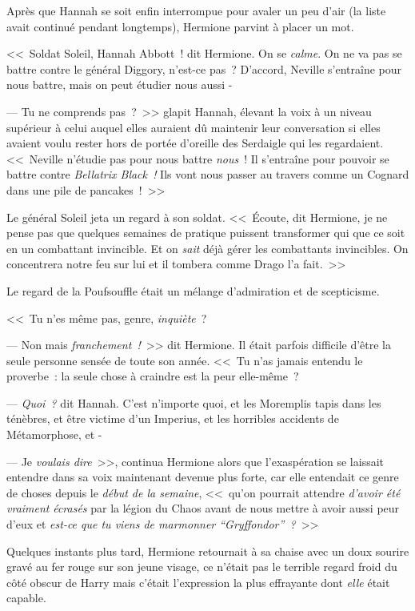 Après que Hannah se soit enfin interrompue pour avaler un peu d'air (la liste avait continué pendant longtemps), Hermione parvint à placer un mot.

<<~Soldat Soleil, Hannah Abbott~! dit Hermione. On se \emph{calme}. On ne va pas se battre contre le général Diggory, n'est-ce pas~? D'accord, Neville s'entraîne pour nous battre, mais on peut étudier nous aussi -

--- Tu ne comprends pas~?~>> glapit Hannah, élevant la voix à un niveau supérieur à celui auquel elles auraient dû maintenir leur conversation si elles avaient voulu rester hors de portée d'oreille des Serdaigle qui les regardaient. <<~Neville n'étudie pas pour nous battre \emph{nous}~! Il s'entraîne pour pouvoir se battre contre \emph{Bellatrix Black~!} Ils vont nous passer au travers comme un Cognard dans une pile de pancakes~!~>>

Le général Soleil jeta un regard à son soldat. <<~Écoute, dit Hermione, je ne pense pas que quelques semaines de pratique puissent transformer qui que ce soit en un combattant invincible. Et on \emph{sait} déjà gérer les combattants invincibles. On concentrera notre feu sur lui et il tombera comme Drago l'a fait.~>>

Le regard de la Poufsouffle était un mélange d'admiration et de scepticisme.

<<~Tu n'es même pas, genre, \emph{inquiète}~?

--- Non mais \emph{franchement~!}~>> dit Hermione. Il était parfois difficile d'être la seule personne sensée de toute son année. <<~Tu n'as jamais entendu le proverbe~: la seule chose à craindre est la peur elle-même~?

--- \emph{Quoi~?} dit Hannah. C'est n'importe quoi, et les Moremplis tapis dans les ténèbres, et être victime d'un Imperius, et les horribles accidents de Métamorphose, et -

--- Je \emph{voulais dire}~>>, continua Hermione alors que l'exaspération se laissait entendre dans sa voix maintenant devenue plus forte, car elle entendait ce genre de choses depuis le \emph{début de la semaine}, <<~qu'on pourrait attendre \emph{d'avoir été} \emph{vraiment} \emph{écrasés} par la légion du Chaos avant de nous mettre à avoir aussi peur d'eux et \emph{est-ce que tu viens de marmonner “Gryffondor”~?}~>>

Quelques instants plus tard, Hermione retournait à sa chaise avec un doux sourire gravé au fer rouge sur son jeune visage, ce n'était pas le terrible regard froid du côté obscur de Harry mais c'était l'expression la plus effrayante dont \emph{elle} était capable.


